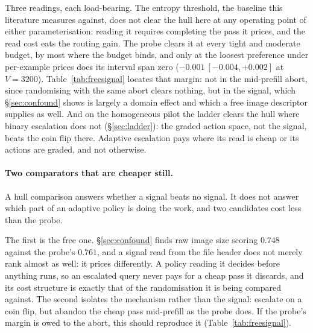 \documentclass[10pt,twocolumn]{article}
\theoremstyle{plain}
\begin{document}
Three readings, each load-bearing. The entropy threshold, the baseline this
literature measures against, does not clear the hull here at any operating
point of either parameterisation: reading it requires completing the pass it
prices, and the read cost eats the routing gain. The probe clears it at every
tight and moderate budget, by most where the budget binds, and only at the
loosest preference under per-example prices does its interval span zero
($-0.001\ [-0.004, +0.002]$ at $V{=}3200$). Table~\ref{tab:freesignal} locates
that margin: not in the mid-prefill abort, since randomising with the same
abort clears nothing, but in the signal, which \S\ref{sec:confound} shows is
largely a domain effect and which a free image descriptor supplies as well. And on the homogeneous pilot the ladder clears the hull where binary
escalation does not (\S\ref{sec:ladder}): the graded action space, not the
signal, beats the coin flip there. Adaptive escalation pays where its read is
cheap or its actions are graded, and not otherwise.


\paragraph{Two comparators that are cheaper still.} A hull comparison answers
whether a signal beats no signal. It does not answer which part of an adaptive
policy is doing the work, and two candidates cost less than the probe.

The first is the free one. \S\ref{sec:confound} finds raw image size scoring
$0.748$ against the probe's $0.761$, and a signal read from the file header
does not merely rank almost as well: it prices differently. A policy reading it
decides before anything runs, so an escalated query never pays for a cheap pass
it discards, and its cost structure is exactly that of the randomisation it is
being compared against. The second isolates the mechanism rather than the
signal: escalate on a coin flip, but abandon the cheap pass mid-prefill as the
probe does. If the probe's margin is owed to the abort, this should reproduce
it (Table~\ref{tab:freesignal}).
\end{document}
